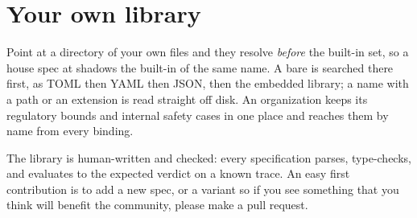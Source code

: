 \section{Your own library}

Point  at a directory of your own files and they resolve \emph{before} the built-in set, so a house spec at  shadows the built-in of the same name. A bare  is searched there first, as TOML then YAML then JSON, then the embedded library; a name with a path or an extension is read straight off disk. An organization keeps its regulatory bounds and internal safety cases in one place and reaches them by name from every binding.

\begin{notebox}
The library is human-written and checked: every specification parses, type-checks, and evaluates to the expected verdict on a known trace. An easy first contribution is to add a new spec, or a variant so if you see something that you think will benefit the community, please make a pull request.
\end{notebox}